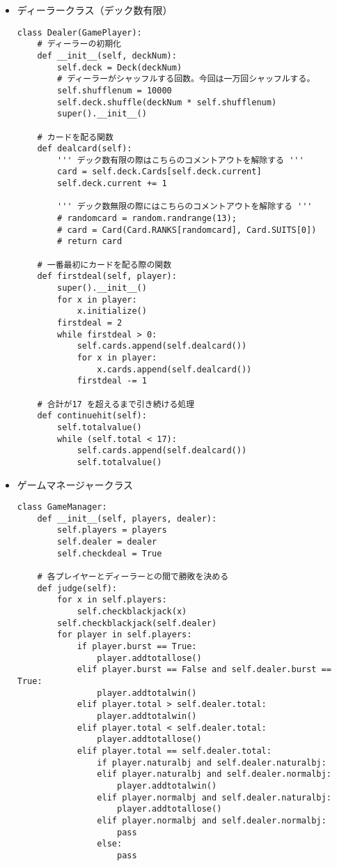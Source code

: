 \begin{itemize}
\item ディーラークラス（デック数有限）
\begin{lstlisting}
class Dealer(GamePlayer):
    # ディーラーの初期化
    def __init__(self, deckNum):
        self.deck = Deck(deckNum)
        # ディーラーがシャッフルする回数。今回は一万回シャッフルする。
        self.shufflenum = 10000
        self.deck.shuffle(deckNum * self.shufflenum)
        super().__init__()

    # カードを配る関数
    def dealcard(self):
        ''' デック数有限の際はこちらのコメントアウトを解除する '''
        card = self.deck.Cards[self.deck.current]
        self.deck.current += 1
        
        ''' デック数無限の際にはこちらのコメントアウトを解除する '''
        # randomcard = random.randrange(13);
        # card = Card(Card.RANKS[randomcard], Card.SUITS[0])
        # return card

    # 一番最初にカードを配る際の関数
    def firstdeal(self, player):
        super().__init__()
        for x in player:
            x.initialize()
        firstdeal = 2
        while firstdeal > 0:
            self.cards.append(self.dealcard())
            for x in player:
                x.cards.append(self.dealcard())
            firstdeal -= 1

    # 合計が17 を超えるまで引き続ける処理
    def continuehit(self):
        self.totalvalue()
        while (self.total < 17):
            self.cards.append(self.dealcard())
            self.totalvalue()

\end{lstlisting}
\end{itemize}

\begin{itemize}
\item ゲームマネージャークラス
\begin{lstlisting}
class GameManager:
    def __init__(self, players, dealer):
        self.players = players
        self.dealer = dealer
        self.checkdeal = True

    # 各プレイヤーとディーラーとの間で勝敗を決める
    def judge(self):
        for x in self.players:
            self.checkblackjack(x)
        self.checkblackjack(self.dealer)
        for player in self.players:
            if player.burst == True:
                player.addtotallose()
            elif player.burst == False and self.dealer.burst == True:
                player.addtotalwin()
            elif player.total > self.dealer.total:
                player.addtotalwin()
            elif player.total < self.dealer.total:
                player.addtotallose()
            elif player.total == self.dealer.total:
                if player.naturalbj and self.dealer.naturalbj:
                elif player.naturalbj and self.dealer.normalbj:
                    player.addtotalwin()
                elif player.normalbj and self.dealer.naturalbj:
                    player.addtotallose()
                elif player.normalbj and self.dealer.normalbj:
                    pass
                else:
                    pass
\end{lstlisting}
\end{itemize}